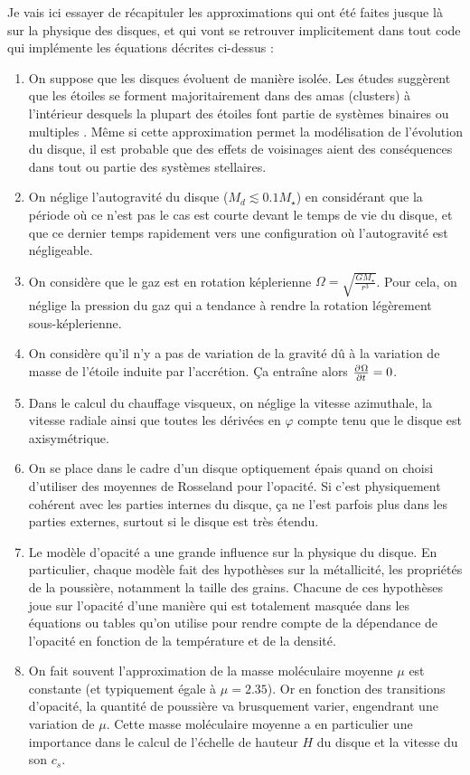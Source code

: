 Je vais ici essayer de récapituler les approximations qui ont été faites jusque là sur la physique des disques, et qui vont se retrouver implicitement dans tout code qui implémente les équations décrites ci-dessus : 
\begin{enumerate}
\item On suppose que les disques évoluent de manière isolée. Les études suggèrent que les étoiles se forment majoritairement dans des amas (clusters) à l'intérieur desquels la plupart des étoiles font partie de systèmes binaires ou multiples \citep{duquennoy1991multiplicity}. Même si cette approximation permet la modélisation de l'évolution du disque, il est probable que des effets de voisinages aient des conséquences dans tout ou partie des systèmes stellaires.
\item On néglige l'autogravité du disque ($M_d \lesssim 0.1M_\star$) en considérant que la période où ce n'est pas le cas est courte devant le temps de vie du disque, et que ce dernier temps rapidement vers une configuration où l'autogravité est négligeable.
\item On considère que le gaz est en rotation képlerienne $\Omega=\sqrt{\frac{GM_\star}{r^3}}$. Pour cela, on néglige la pression du gaz qui a tendance à rendre la rotation légèrement sous-képlerienne.
\item On considère qu'il n'y a pas de variation de la gravité dû à la variation de masse de l'étoile induite par l'accrétion. Ça entraîne alors $\pd{\Omega}{t} = 0$.
\item Dans le calcul du chauffage visqueux, on néglige la vitesse azimuthale, la vitesse radiale ainsi que toutes les dérivées en $\varphi$ compte tenu que le disque est axisymétrique.
\item On se place dans le cadre d'un disque optiquement épais quand on choisi d'utiliser des moyennes de Rosseland pour l'opacité. Si c'est physiquement cohérent avec les parties internes du disque, ça ne l'est parfois plus dans les parties externes, surtout si le disque est très étendu.
\item Le modèle d'opacité a une grande influence sur la physique du disque. En particulier, chaque modèle fait des hypothèses sur la métallicité, les propriétés de la poussière, notamment la taille des grains. Chacune de ces hypothèses joue sur l'opacité d'une manière qui est totalement masquée dans les équations ou tables qu'on utilise pour rendre compte de la dépendance de l'opacité en fonction de la température et de la densité.
\item On fait souvent l'approximation de la masse moléculaire moyenne $\mu$ est constante (et typiquement égale à $\mu=2.35$). Or en fonction des transitions d'opacité, la quantité de poussière va brusquement varier, engendrant une variation de $\mu$. Cette masse moléculaire moyenne a en particulier une importance dans le calcul de l'échelle de hauteur $H$ du disque et la vitesse du son $c_s$. 

\end{enumerate}
